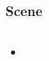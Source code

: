 \begin{frame}
\frametitle{Scene}
\begin{columns}




\begin{itemize}
\item
\end{itemize}




\end{columns}
\end{frame}
